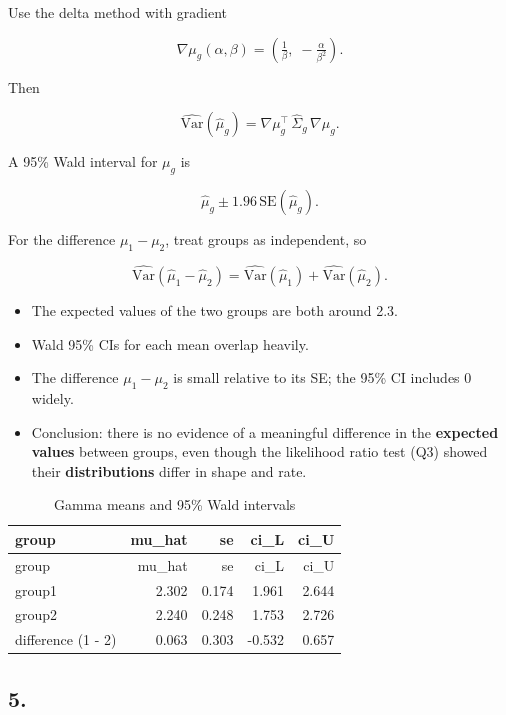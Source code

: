 \documentclass[
]{article}
\providecommand{\tightlist}{%
  \setlength{\itemsep}{0pt}\setlength{\parskip}{0pt}}
\begin{document}
Use the delta method with gradient

\[
\nabla\mu_g(\alpha,\beta) = \left(\tfrac{1}{\beta},\; -\tfrac{\alpha}{\beta^2}\right).
\]

Then

\[
\widehat{\mathrm{Var}}(\hat\mu_g)
= \nabla\mu_g^\top \,\widehat\Sigma_g \,\nabla\mu_g.
\]

A 95\% Wald interval for \(\mu_g\) is

\[
\hat\mu_g \pm 1.96\,\mathrm{SE}(\hat\mu_g).
\]

For the difference \(\mu_1-\mu_2\), treat groups as independent, so

\[
\widehat{\mathrm{Var}}(\hat\mu_1-\hat\mu_2)
= \widehat{\mathrm{Var}}(\hat\mu_1)+\widehat{\mathrm{Var}}(\hat\mu_2).
\]

\begin{itemize}
\tightlist
\item
  The expected values of the two groups are both around 2.3.
\item
  Wald 95\% CIs for each mean overlap heavily.
\item
  The difference \(\mu_1-\mu_2\) is small relative to its SE; the 95\%
  CI includes 0 widely.
\item
  Conclusion: there is no evidence of a meaningful difference in the
  \textbf{expected values} between groups, even though the likelihood
  ratio test (Q3) showed their \textbf{distributions} differ in shape
  and rate.
\end{itemize}

\begin{longtable}[]{@{}lrrrr@{}}
\caption{Gamma means and 95\% Wald intervals}\tabularnewline
\toprule\noalign{}
group & mu\_hat & se & ci\_L & ci\_U \\
\midrule\noalign{}
\endfirsthead
\toprule\noalign{}
group & mu\_hat & se & ci\_L & ci\_U \\
\midrule\noalign{}
\endhead
\bottomrule\noalign{}
\endlastfoot
group1 & 2.302 & 0.174 & 1.961 & 2.644 \\
group2 & 2.240 & 0.248 & 1.753 & 2.726 \\
difference (1 - 2) & 0.063 & 0.303 & -0.532 & 0.657 \\
\end{longtable}

\newpage

\subsection{5.}\label{section-4}
\end{document}
